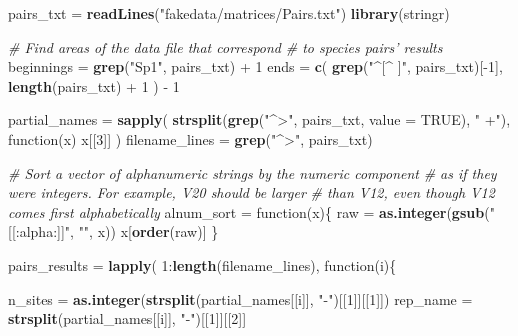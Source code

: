 \documentclass[11pt,]{article}
\newenvironment{Shaded}{\begin{snugshade}}{\end{snugshade}}
\newcommand{\KeywordTok}[1]{\textcolor[rgb]{0.13,0.29,0.53}{\textbf{{#1}}}}
\newcommand{\DataTypeTok}[1]{\textcolor[rgb]{0.13,0.29,0.53}{{#1}}}
\newcommand{\DecValTok}[1]{\textcolor[rgb]{0.00,0.00,0.81}{{#1}}}
\newcommand{\StringTok}[1]{\textcolor[rgb]{0.31,0.60,0.02}{{#1}}}
\newcommand{\CommentTok}[1]{\textcolor[rgb]{0.56,0.35,0.01}{\textit{{#1}}}}
\newcommand{\OtherTok}[1]{\textcolor[rgb]{0.56,0.35,0.01}{{#1}}}
\newcommand{\NormalTok}[1]{{#1}}
\begin{document}
\begin{Shaded}
\begin{Highlighting}[]
\NormalTok{pairs_txt =}\StringTok{ }\KeywordTok{readLines}\NormalTok{(}\StringTok{"fakedata/matrices/Pairs.txt"}\NormalTok{)}
\KeywordTok{library}\NormalTok{(stringr)}

\CommentTok{# Find areas of the data file that correspond}
\CommentTok{# to species pairs' results}
\NormalTok{beginnings =}\StringTok{ }\KeywordTok{grep}\NormalTok{(}\StringTok{"Sp1"}\NormalTok{, pairs_txt) +}\StringTok{ }\DecValTok{1}
\NormalTok{ends =}\StringTok{ }\KeywordTok{c}\NormalTok{(}
  \KeywordTok{grep}\NormalTok{(}\StringTok{"^[^ ]"}\NormalTok{, pairs_txt)[-}\DecValTok{1}\NormalTok{],}
  \KeywordTok{length}\NormalTok{(pairs_txt) +}\StringTok{ }\DecValTok{1}
\NormalTok{) -}\StringTok{ }\DecValTok{1}

\NormalTok{partial_names =}\StringTok{ }\KeywordTok{sapply}\NormalTok{(}
  \KeywordTok{strsplit}\NormalTok{(}\KeywordTok{grep}\NormalTok{(}\StringTok{"^>"}\NormalTok{, pairs_txt, }\DataTypeTok{value =} \OtherTok{TRUE}\NormalTok{), }\StringTok{" +"}\NormalTok{), }
  \NormalTok{function(x) x[[}\DecValTok{3}\NormalTok{]]}
\NormalTok{)}
\NormalTok{filename_lines =}\StringTok{ }\KeywordTok{grep}\NormalTok{(}\StringTok{"^>"}\NormalTok{, pairs_txt)}

\CommentTok{# Sort a vector of alphanumeric strings by the numeric component}
\CommentTok{# as if they were integers.  For example, V20 should be larger }
\CommentTok{# than V12, even though V12 comes first alphabetically}
\NormalTok{alnum_sort =}\StringTok{ }\NormalTok{function(x)\{}
  \NormalTok{raw =}\StringTok{ }\KeywordTok{as.integer}\NormalTok{(}\KeywordTok{gsub}\NormalTok{(}\StringTok{"[[:alpha:]]"}\NormalTok{, }\StringTok{""}\NormalTok{, x))}
  \NormalTok{x[}\KeywordTok{order}\NormalTok{(raw)]}
\NormalTok{\}}

\NormalTok{pairs_results =}\StringTok{ }\KeywordTok{lapply}\NormalTok{(}
  \DecValTok{1}\NormalTok{:}\KeywordTok{length}\NormalTok{(filename_lines),}
  \NormalTok{function(i)\{}
    
    \NormalTok{n_sites =}\StringTok{ }\KeywordTok{as.integer}\NormalTok{(}\KeywordTok{strsplit}\NormalTok{(partial_names[[i]], }\StringTok{"-"}\NormalTok{)[[}\DecValTok{1}\NormalTok{]][[}\DecValTok{1}\NormalTok{]])}
    \NormalTok{rep_name =}\StringTok{ }\KeywordTok{strsplit}\NormalTok{(partial_names[[i]], }\StringTok{"-"}\NormalTok{)[[}\DecValTok{1}\NormalTok{]][[}\DecValTok{2}\NormalTok{]]}
    

\end{Highlighting}
\end{Shaded}
\end{document}
